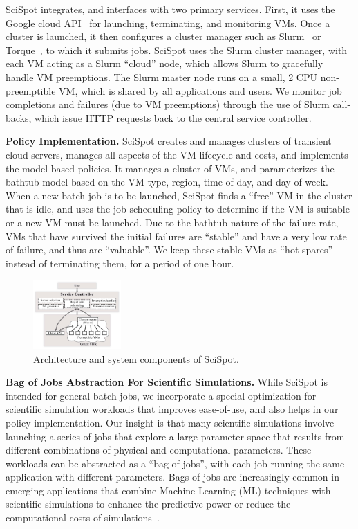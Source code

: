 \documentclass[compsoc]{IEEEtran}
\newcommand{\sysname}{SciSpot\xspace}
\newcommand{\myfigspace}[0]{-0.45cm}
\begin{document}
\sysname integrates, and interfaces with two primary services.
First, it uses the Google cloud API~\cite{gcloud-api} for launching, terminating, and monitoring VMs.
Once a cluster is launched, it then configures a cluster manager such as Slurm~\cite{slurm} or Torque~\cite{torque}, to which it submits jobs. 
\sysname uses the Slurm cluster manager, with each VM acting as a Slurm ``cloud'' node, which allows Slurm to gracefully handle VM preemptions.
The Slurm master node runs on a small, 2 CPU non-preemptible VM, which is shared by all applications and users. 
We monitor job completions and failures (due to VM preemptions) through the use of Slurm call-backs, which issue HTTP requests back to the central service controller. 

\noindent \textbf{Policy Implementation.}
\sysname creates and manages clusters of transient cloud servers, manages all aspects of the VM lifecycle and costs, and implements the model-based policies.
It manages a cluster of VMs, and parameterizes the bathtub model based on the VM type, region,  time-of-day, and day-of-week.
When a new batch job is to be launched, \sysname finds a ``free'' VM in the cluster that is idle, and uses the job scheduling policy to determine if the VM is suitable or a new VM must be launched. 
Due to the bathtub nature of the failure rate, VMs that have survived the initial failures are ``stable'' and have a very low rate of failure, and thus are ``valuable''.
We keep these stable VMs as ``hot spares'' instead of terminating them, for a period of one hour. 



\begin{figure}[t]
  \centering 
  \includegraphics[width=0.3\textwidth]{ArchitectureRevisedV2.pdf}
\vspace*{\myfigspace}
  \caption{Architecture and system components of SciSpot.}
  \label{fig:arch}
  \vspace*{\myfigspace}
\end{figure}


\noindent \textbf{Bag of Jobs Abstraction For Scientific Simulations.}
While \sysname is intended for general batch jobs, we incorporate a special optimization for scientific simulation workloads that improves ease-of-use, and also helps in our policy implementation. 
Our insight is that many scientific simulations involve launching a series of jobs that explore a large parameter space that results from different combinations of physical and computational parameters.
These workloads can be abstracted as a ``bag of jobs'', with each job running the same application with  different parameters.
Bags of jobs are increasingly common in emerging applications that combine Machine Learning (ML) techniques with scientific simulations to enhance the predictive power or reduce the
computational costs of  simulations~\cite{ferguson2017machine,wang2019machine,casalino2021ai,kadupitiya2020machine,kadupitiya2020machine2}. 
\end{document}
